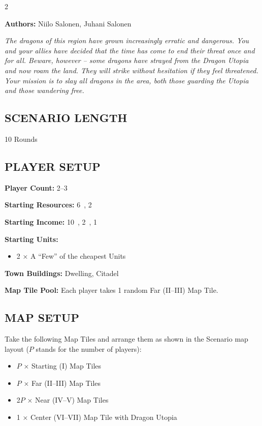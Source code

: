 
\begin{multicols}{2}

\textbf{Authors:} Niilo Salonen, Juhani Salonen

\textit{The dragons of this region have grown increasingly erratic and dangerous.
You and your allies have decided that the time has come to end their threat once and for all.
Beware, however -- some dragons have strayed from the Dragon Utopia and now roam the land.
They will strike without hesitation if they feel threatened.
Your mission is to slay all dragons in the area, both those guarding the Utopia and those wandering free.}  %

\subsection*{\MakeUppercase{Scenario Length}}
10 Rounds

\subsection*{\MakeUppercase{Player Setup}}
\textbf{Player Count:} 2--3

\textbf{Starting Resources:} 6~, 2~

\textbf{Starting Income:} 10~, 2~, 1~

\textbf{Starting Units:}

\begin{itemize}
  \item 2 × A ``Few'' of the cheapest  Units
\end{itemize}

\textbf{Town Buildings:}  Dwelling, Citadel

\textbf{Map Tile Pool:} Each player takes 1 random Far (II--III) Map Tile.

\subsection*{\MakeUppercase{Map Setup}}
Take the following Map Tiles and arrange them as shown in the Scenario map layout ($P$ stands for the number of players):

\begin{itemize}
  \item $P$ × Starting (I) Map Tiles
  \item $P$ × Far (II–III) Map Tiles
  \item 2$P$ × Near (IV–V) Map Tiles
  \item 1 × Center (VI–VII) Map Tile with Dragon Utopia
\end{itemize}


\end{multicols}
